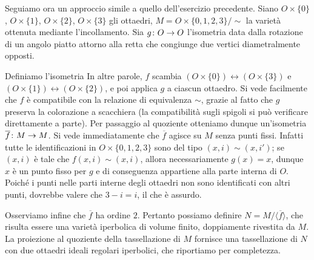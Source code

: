 Seguiamo ora un approccio simile a quello dell'esercizio precedente. Siano $O\times\{0\}$, $O\times\{1\}$, $O\times\{2\}$, $O\times\{3\}$ gli ottaedri, $M=O\times\{0,1,2,3\}/\sim$ la varietà ottenuta mediante l'incollamento. Sia $\map{g}{O}{O}$ l'isometria data dalla rotazione di un angolo piatto attorno alla retta che congiunge due vertici diametralmente opposti.
\begin{center}
\end{center}
Definiamo l'isometria
In altre parole, $f$ scambia $(O\times\{0\})\leftrightarrow (O\times\{3\})$ e $(O\times\{1\})\leftrightarrow (O\times\{2\})$, e poi applica $g$ a ciascun ottaedro. Si vede facilmente che $f$ è compatibile con la relazione di equivalenza $\sim$, grazie al fatto che $g$ preserva la colorazione a scacchiera (la compatibilità sugli spigoli si può verificare direttamente a parte). Per passaggio al quoziente otteniamo dunque un'isometria $\map{\overline{f}}{M}{M}$. Si vede immediatamente che $\overline{f}$ agisce su $M$ senza punti fissi. Infatti tutte le identificazioni in $O\times\{0,1,2,3\}$ sono del tipo $(x,i)\sim(x,i')$; se $(x,i)$ è tale che $f(x,i)\sim (x,i)$, allora necessariamente $g(x)=x$, dunque $x$  è un punto fisso per $g$ e di conseguenza appartiene alla parte interna di $O$. Poiché i punti nelle parti interne degli ottaedri non sono identificati con altri punti, dovrebbe valere che $3-i=i$, il che è assurdo.

Osserviamo infine che $\overline{f}$ ha ordine $2$. Pertanto possiamo definire $N=M/\langle\overline{f}\rangle$, che risulta essere una varietà iperbolica di volume finito, doppiamente rivestita da $M$. La proiezione al quoziente della tassellazione di $M$ fornisce una tassellazione di $N$ con due ottaedri ideali regolari iperbolici, che riportiamo per completezza.

